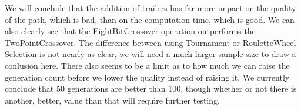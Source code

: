We will conclude that the addition of trailers has far more impact on the quality of the path, which is bad, than on the computation time, which is good. We can also clearly see that the EightBitCrossover operation outperforms the TwoPointCrossover. The difference between using Tournament or RouletteWheel Selection is not nearly as clear, we will need a much larger sample size to draw a conlusion here. 
There also seems to be a limit as to how much we can raise the generation count before we lower the quality instead of raising it. We currently conclude that 50 generations are better than 100, though whether or not there is another, better, value than that will require further testing.